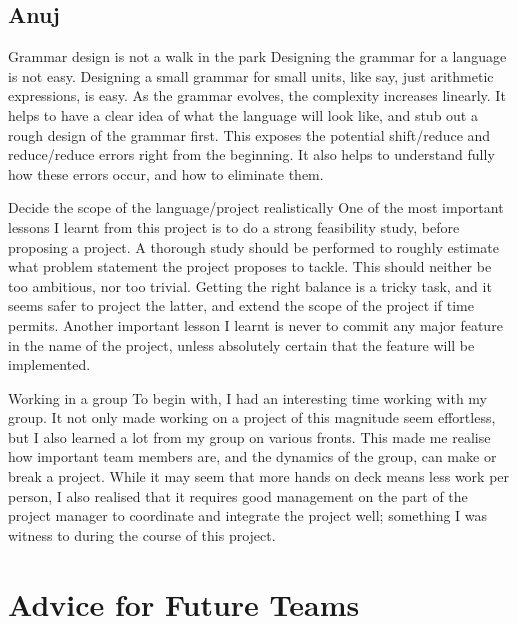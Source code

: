 \documentclass[12pt]{report}
\begin{document}
\subsection{Anuj}

Grammar design is not a walk in the park
Designing the grammar for a language is not easy. Designing a small grammar for small units, like say, just arithmetic expressions, is easy. As the grammar evolves, the complexity increases linearly. It helps to have a clear idea of what the language will look like, and stub out a rough design of the grammar first. This exposes the potential shift/reduce and reduce/reduce errors right from the beginning. It also helps to understand fully how these errors occur, and how to eliminate them.

Decide the scope of the language/project realistically
One of the most important lessons I learnt from this project is to do a strong feasibility study, before proposing a project. A thorough study should be performed to roughly estimate what problem statement the project proposes to tackle. This should neither be too ambitious, nor too trivial. Getting the right balance is a tricky task, and it seems safer to project the latter, and extend the scope of the project if time permits. Another important lesson I learnt is never to commit any major feature in the name of the project, unless absolutely certain that the feature will be implemented.

Working in a group
To begin with, I had an interesting time working with my group. It not only made working on a project of this magnitude seem effortless, but I also learned a lot from my group on various fronts. This made me realise how important team members are, and the dynamics of the group, can make or break a project. While it may seem that more hands on deck means less work per person, I also realised that it requires good management on the part of the project manager to coordinate and integrate the project well; something I was witness to during the course of this project.

\section{Advice for Future Teams}
\end{document}
